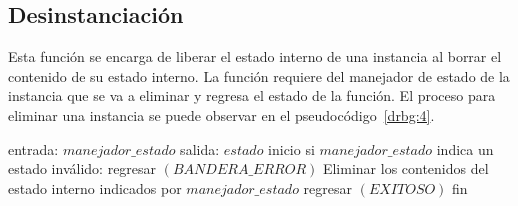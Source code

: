 \subsection{Desinstanciación}
Esta función se encarga de liberar el estado interno de una instancia al borrar
el contenido de su estado interno. La función requiere del manejador de estado
de la instancia que se va a eliminar y regresa el estado de la función. El
proceso para eliminar una instancia se puede observar en el
pseudocódigo~\ref{drbg:4}.

\begin{pseudocodigo}[caption={DRBG, desinstanciación.}, label={drbg:4}]
    entrada:  $manejador\_estado$
    salida:   $estado$
    inicio
      si $manejador\_estado$ indica un estado inválido:
        regresar $(BANDERA\_ERROR)$
      Eliminar los contenidos del estado interno indicados por $manejador\_estado$
      regresar $(EXITOSO)$
    fin
\end{pseudocodigo}
